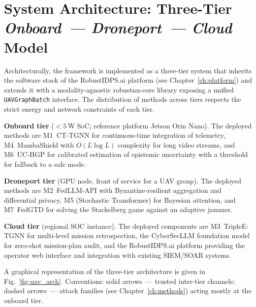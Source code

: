 \section{System Architecture: Three-Tier
\emph{Onboard~--- Droneport~--- Cloud} Model}
\label{sec:uav_arch}

Architecturally, the framework is implemented as a three-tier system
that inherits the software stack of the \textsf{RobustIDPS.ai}
platform (see Chapter~\ref{ch:platform}) and extends it with a
modality-agnostic \textsf{robustnn-core} library exposing a unified
\texttt{UAVGraphBatch} interface. The distribution of methods across
tiers respects the strict energy and network constraints of each tier.

\noindent\textbf{Onboard tier} ($<\!5\,$W SoC; reference platform
Jetson Orin Nano). The deployed methods are \textsf{M1~CT-TGNN} for
continuous-time integration of telemetry, \textsf{M4~MambaShield} with
$O(L\log L)$ complexity for long video streams, and
\textsf{M6~UC-HGP} for calibrated estimation of epistemic uncertainty
with a threshold for fallback to a safe mode.

\noindent\textbf{Droneport tier} (GPU node, front of service for a
UAV group). The deployed methods are \textsf{M2~FedLLM-API} with
Byzantine-resilient aggregation and differential privacy, \textsf{M5}
(Stochastic Transformer) for Bayesian attention, and
\textsf{M7~FedGTD} for solving the Stackelberg game against an
adaptive jammer.

\noindent\textbf{Cloud tier} (regional SOC instance). The deployed
components are \textsf{M3~TripleE-TGNN} for multi-level mission
retrospection, the \textsf{CyberSecLLM} foundation model for
zero-shot mission-plan audit, and the \textsf{RobustIDPS.ai} platform
providing the operator web interface and integration with existing
SIEM/SOAR systems.

A graphical representation of the three-tier architecture is given in
Fig.~\ref{fig:uav_arch}. Conventions: solid arrows~--- trusted
inter-tier channels; dashed arrows~--- attack families
(see Chapter~\ref{ch:methods}) acting mostly at the onboard tier.


